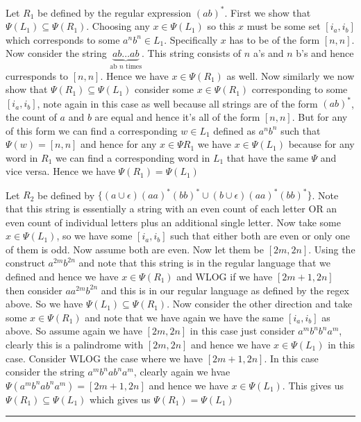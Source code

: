 \documentclass[11pt]{article}
\newenvironment{proof}{{\bf Proof:}}{\hfill\rule{2mm}{2mm}}
\begin{document}
\begin{proof}
Let $R_{1}$ be defined by the regular expression $(ab)^{*}$. First we show that $\Psi(L_{1}) \subseteq \Psi(R_{1})$. Choosing any $x \in \Psi(L_{1})$ so this $x$ must be some set $[i_{a},i_{b}]$ which corresponds to some $a^{n}b^{n} \in L_{1}$. Specifically $x$ has to be of the form $[n, n]$. Now consider the string $\underbrace{ab \dots ab}_{\text{ab } n \text{ times}}$. This string consists of $n$ a's and $n$ b's and hence curresponds to $[n,n]$. Hence we have $x \in \Psi(R_{1})$ as well. Now similarly we now show that $\Psi(R_{1}) \subseteq \Psi(L_{1})$ consider some $x \in \Psi(R_{1})$ corresponding to some $[i_a, i_b]$, note again in this case as well because all strings are of the form $(ab)^{*}$, the count of $a$ and $b$ are equal and hence it's all of the form $[n,n]$. But for any of this form we can find a corresponding $w \in L_{1}$ defined as $a^{n}b^{n}$ such that $\Psi(w) = [n,n]$ and hence for any $x \in \Psi{R_{1}} $ we have $x \in \Psi(L_{1})$ because for any word in $R_{1}$ we can find a corresponding word in $L_{1}$ that have the same $\Psi$ and vice versa. Hence we have $\Psi(R_{1}) = \Psi(L_{1})$

\vspace{1em}

Let $R_{2}$ be defined by $ \{(a \cup \epsilon)(aa)^{*}(bb)^{*} \cup (b \cup \epsilon)(aa)^{*}(bb)^{*} \}$. Note that this string is essentially a string with an even count of each letter OR an even count of individual letters plus an additional single letter. Now take some $x \in \Psi(L_{1})$, so we have some $[i_a, i_b]$ such that either both are even or only one of them is odd. Now assume both are even. Now let them be $[2m, 2n]$. Using the construct $a^{2m}b^{2n}$ and note that this string is in the regular language that we defined and hence we have $x \in \Psi(R_{1})$ and WLOG if we have $[2m + 1, 2n]$ then consider $a a^{2m}b^{2n}$ and this is in our regular language as defined by the regex above. So we have $\Psi(L_{1}) \subseteq \Psi(R_{1})$. Now consider the other direction  and take some $x \in \Psi(R_{1})$ and note that we have again we have the same $[i_a, i_b]$ as above. So assume again we have $[2m, 2n]$ in this case just consider $a^{m}b^{n}b^{n}a^{m}$, clearly this is a palindrome with $[2m, 2n]$ and hence we have $x \in \Psi(L_{1})$ in this case. Consider WLOG the case where we have $[2m + 1, 2n]$. In this case consider the string $a^{m}b^{n}ab^{n}a^{m}$, clearly again we hvae $\Psi(a^{m}b^{n}ab^{n}a^{m}) = [2m + 1, 2n]$ and hence we have $x \in \Psi(L_{1})$. This gives us $\Psi(R_{1}) \subseteq \Psi(L_{1})$ which gives us $\Psi(R_{1}) = \Psi(L_{1})$
\end{proof}
\end{document}
